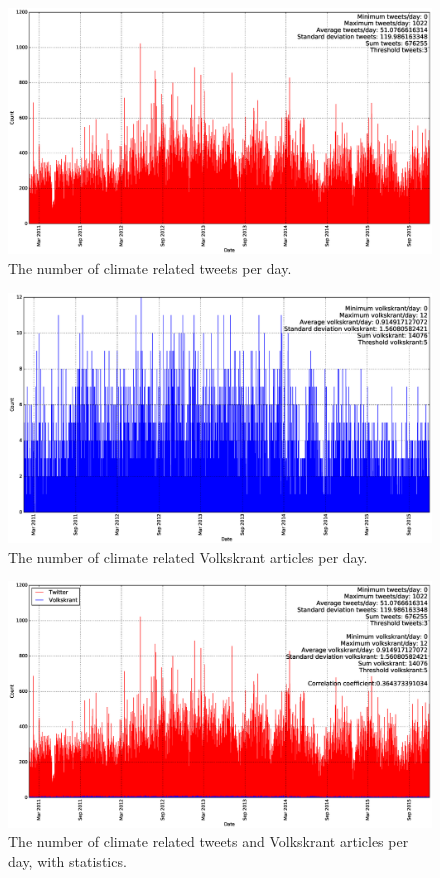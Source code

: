 \documentclass[paper=a4, fontsize=9px]{scrartcl} %
\numberwithin{equation}{section} %
\numberwithin{figure}{section} %
\numberwithin{table}{section} %
\begin{document}
\begin{figure}
	\includegraphics[width=\textwidth]{img/twitter_plot_threshold}
	\caption{The number of climate related tweets per day.}\label{fig:5}
\end{figure}
\begin{figure}
	\includegraphics[width=\textwidth]{img/volkskrant_plot_threshold}
	\caption{The number of climate related Volkskrant articles per day.}\label{fig:6}
\end{figure}
\begin{figure}
	\includegraphics[width=\textwidth]{img/volkskrant_twitter_plot_threshold}
	\caption{The number of climate related tweets and Volkskrant articles per day, with statistics.}\label{fig:8}
\end{figure}
\end{document}

